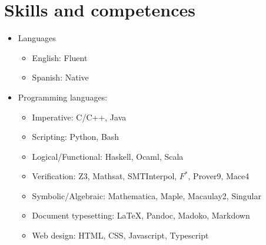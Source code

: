 \section{Skills and competences}

\begin{itemize}
\item Languages
  \begin{itemize}
  \item English: Fluent
  \item Spanish: Native
  \end{itemize}
  
\item Programming languages:
  \begin{itemize}
  \item Imperative: C/C++, Java
  \item Scripting: Python, Bash
  \item Logical/Functional: Haskell, Ocaml, Scala
  \item Verification: Z3, Mathsat, SMTInterpol, 
    $F^{*}$, Prover9, Mace4 
  \item Symbolic/Algebraic: Mathematica, Maple, Macaulay2, Singular
  \item Document typesetting: \LaTeX, Pandoc, Madoko, Markdown
  \item Web design: HTML, CSS, Javascript, Typescript
  \end{itemize}
  
\end{itemize}


